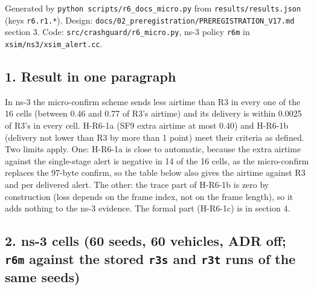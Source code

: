 


Generated by \texttt{python scripts/r6\_docs\_micro.py} from \texttt{results/results.json} (keys \texttt{r6.r1.*}). Design: \texttt{docs/02\_preregistration/PREREGISTRATION\_V17.md} section 3. Code: \texttt{src/crashguard/r6\_micro.py}, ns-3 policy \texttt{r6m} in \texttt{xsim/ns3/xsim\_alert.cc}.


\subsection*{1. Result in one paragraph}

In ns-3 the micro-confirm scheme sends less airtime than R3 in every one of the 16 cells (between 0.46 and 0.77 of R3's airtime) and its delivery is within 0.0025 of R3's in every cell. H-R6-1a (SF9 extra airtime at most 0.40) and H-R6-1b (delivery not lower than R3 by more than 1 point) meet their criteria as defined. Two limits apply. One: H-R6-1a is close to automatic, because the extra airtime against the single-stage alert is negative in 14 of the 16 cells, as the micro-confirm replaces the 97-byte confirm, so the table below also gives the airtime against R3 and per delivered alert. The other: the trace part of H-R6-1b is zero by construction (loss depends on the frame index, not on the frame length), so it adds nothing to the ns-3 evidence. The formal part (H-R6-1c) is in section 4.

\subsection*{2. ns-3 cells (60 seeds, 60 vehicles, ADR off; \texttt{r6m} against the stored \texttt{r3s} and \texttt{r3t} runs of the same seeds)}

